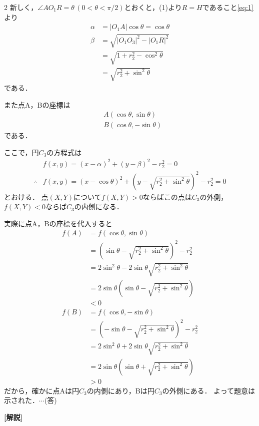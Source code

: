 \documentclass[../../main.tex]{subfiles}
\begin{document}
\begin{multicols}{2}
  新しく，$\angle AO_1R=\theta\, (0 <\theta < \pi/2)$とおくと，(1)より$R=H$であること\cref{eq:1}より
  \begin{align}
    \alpha & = |O_1A|\cos\theta = \cos\theta   \\
    \beta  & = \sqrt{|O_1O_3|^2 - |O_1R|^2}    \\
    & = \sqrt{1 + r_2^2 - \cos^2\theta} \\
    & = \sqrt{r_2^2 + \sin^2\theta}
  \end{align}
  である．

  また点A，Bの座標は
  \begin{align}
    & A(\cos\theta,\sin\theta)  \\
    & B(\cos\theta,-\sin\theta)
  \end{align}
  である．

  ここで，円$C_3$の方程式は
  \begin{align}
    & f(x,y) = (x-\alpha)^2+(y-\beta)^2 - r_2^2 = 0                              \\
    \therefore
    & f(x,y) = (x-\cos\theta)^2 + (y - \sqrt{r_2^2 + \sin^2\theta})^2 -r_2^2 = 0
  \end{align}
  とおける．
  点$(X,Y)$について$f(X,Y)>0$ならばこの点は$C_3$の外側，
  $f(X,Y)<0$ならば$C_3$の内側になる．

  実際に点A，Bの座標を代入すると
  \begin{align}
    f(A)
    & = f(\cos\theta,\sin\theta)                                         \\
    & = (\sin\theta - \sqrt{r_2^2 + \sin^2\theta})^2 - r_2^2             \\
    & = 2\sin^2\theta - 2\sin\theta \sqrt{r_2^2 + \sin^2\theta}          \\
    & = 2\sin\theta\left(\sin\theta - \sqrt{r_2^2 + \sin^2\theta}\right) \\
    & < 0                                                                \\
    f(B)
    & = f(\cos\theta,-\sin\theta)                                        \\
    & = \left(-\sin\theta - \sqrt{r_2^2 + \sin^2\theta}\right)^2 - r_2^2 \\
    & = 2\sin^2\theta + 2\sin\theta \sqrt{r_2^2 + \sin^2\theta}          \\
    & = 2\sin\theta\left(\sin\theta + \sqrt{r_2^2 + \sin^2\theta}\right) \\
    & > 0
  \end{align}
  だから，確かに点Aは円$C_3$の内側にあり，Bは円$C_3$の外側にある．
  よって題意は示された．$\cdots$(答)

  {\bf [解説]}

  \newpage
\end{multicols}
\end{document}
